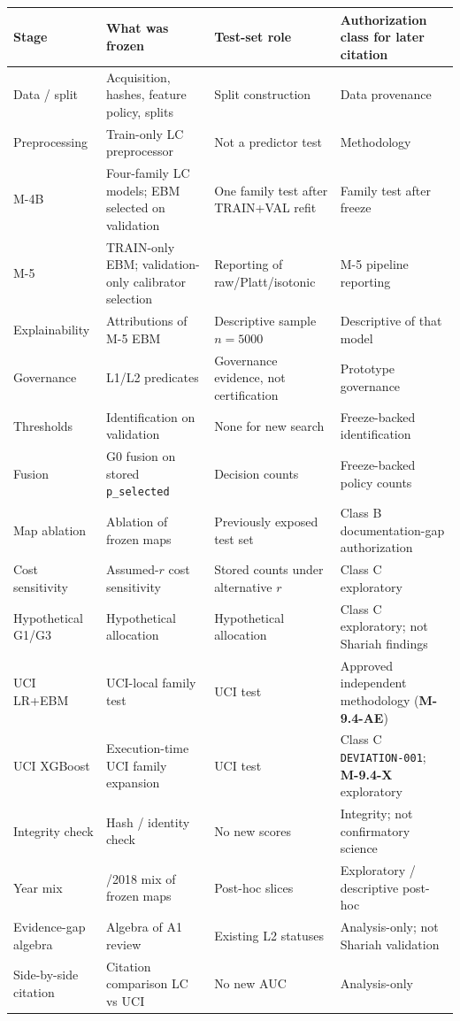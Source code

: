 \documentclass{ieeeaccess}
\begin{document}
\begin{table}[!t]
\centering
\footnotesize
\setlength{\tabcolsep}{3pt}
\begin{tabularx}{\textwidth}{|>{\raggedright\arraybackslash}p{}|>{\raggedright\arraybackslash}X|>{\raggedright\arraybackslash}p{}|>{\raggedright\arraybackslash}X|}
\hline
Stage & What was frozen & Test-set role & Authorization class for later citation \\
\hline
Data / split & Acquisition, hashes, feature policy, splits & Split construction & Data provenance \\
\hline
Preprocessing & Train-only LC preprocessor & Not a predictor test & Methodology \\
\hline
M-4B & Four-family LC models; EBM selected on validation & One family test after TRAIN+VAL refit & Family test after freeze \\
\hline
M-5 & TRAIN-only EBM; validation-only calibrator selection & Reporting of raw/Platt/isotonic & M-5 pipeline reporting \\
\hline
Explainability & Attributions of M-5 EBM & Descriptive sample \(n=5000\) & Descriptive of that model \\
\hline
Governance & L1/L2 predicates & Governance evidence, not certification & Prototype governance \\
\hline
Thresholds & Identification on validation & None for new search & Freeze-backed identification \\
\hline
Fusion & G0 fusion on stored \texttt{p\_selected} & Decision counts & Freeze-backed policy counts \\
\hline
Map ablation & Ablation of frozen maps & Previously exposed test set & Class B documentation-gap authorization \\
\hline
Cost sensitivity & Assumed-\(r\) cost sensitivity & Stored counts under alternative \(r\) & Class C exploratory \\
\hline
Hypothetical G1/G3 & Hypothetical allocation & Hypothetical allocation & Class C exploratory; not Shariah findings \\
\hline
UCI LR+EBM & UCI-local family test & UCI test & Approved independent methodology (\textbf{M-9.4-AE}) \\
\hline
UCI XGBoost & Execution-time UCI family expansion & UCI test & Class C \texttt{DEVIATION-001}; \textbf{M-9.4-X} exploratory \\
\hline
Integrity check & Hash / identity check & No new scores & Integrity; not confirmatory science \\
\hline
Year mix & 2017/2018 mix of frozen maps & Post-hoc slices & Exploratory / descriptive post-hoc \\
\hline
Evidence-gap algebra & Algebra of A1 review & Existing L2 statuses & Analysis-only; not Shariah validation \\
\hline
Side-by-side citation & Citation comparison LC vs UCI & No new AUC & Analysis-only \\
\hline
\end{tabularx}
\end{table}
\end{document}
